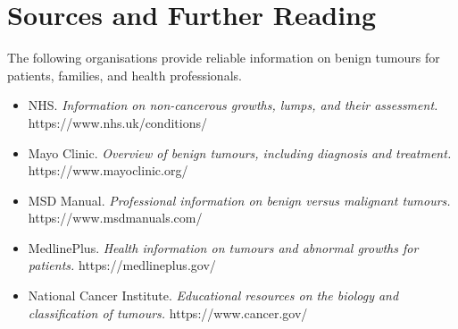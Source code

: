\section*{Sources and Further Reading}
The following organisations provide reliable information on benign tumours for patients, families, and health professionals.

\begin{itemize}
    \item NHS. \textit{Information on non-cancerous growths, lumps, and their assessment.} https://www.nhs.uk/conditions/
    \item Mayo Clinic. \textit{Overview of benign tumours, including diagnosis and treatment.} https://www.mayoclinic.org/
    \item MSD Manual. \textit{Professional information on benign versus malignant tumours.} https://www.msdmanuals.com/
    \item MedlinePlus. \textit{Health information on tumours and abnormal growths for patients.} https://medlineplus.gov/
    \item National Cancer Institute. \textit{Educational resources on the biology and classification of tumours.} https://www.cancer.gov/
\end{itemize}
